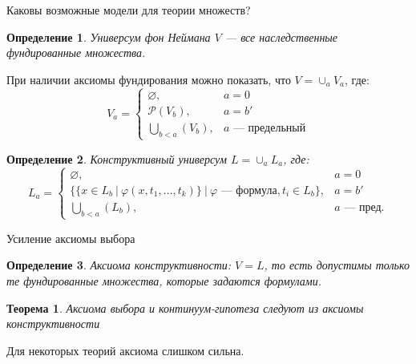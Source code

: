 \documentclass[aspectratio=169]{beamer}
\newtheorem{thm}{Теорема}[section]
\newtheorem{dfn}{Определение}[section]
\begin{document}
\begin{frame}{Каковы возможные модели для теории множеств?}
\begin{dfn}\emph{Универсум фон Неймана} $V$ --- все наследственные фундированные множества.\end{dfn}

При наличии аксиомы фундирования можно показать, что $V = \cup_a V_a$, где:
$$V_a = \left\{\begin{array}{ll}
    \varnothing, & a=0\\
    \mathcal{P}(V_b), & a = b'\\
    \bigcup_{b < a}(V_b), & a \text{ --- предельный}
\end{array}\right.$$

\begin{dfn}
\emph{Конструктивный универсум} $L = \cup_a L_a$, где:
$$L_a = \left\{\begin{array}{ll}
    \varnothing, & a=0\\
    \{ \{ x\in L_b\ |\ \varphi(x,t_1,\dots,t_k) \}\ |\ \varphi\text{ --- формула}, t_i \in L_b\}, & a = b'\\
    \bigcup_{b < a}(L_b), & a \text{ --- пред.}
\end{array}\right.$$
\end{dfn}
\end{frame}

\begin{frame}{Усиление аксиомы выбора}
\begin{dfn}
Аксиома конструктивности: $V=L$, то есть допустимы только те фундированные множества, которые задаются формулами.
\end{dfn}

\begin{thm}Аксиома выбора и континуум-гипотеза следуют из аксиомы конструктивности\end{thm}

Для некоторых теорий аксиома слишком сильна.
\end{frame}
\end{document}
